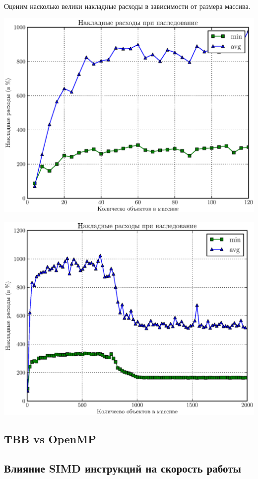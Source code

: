 \documentclass[12pt, a4paper]{article}
\begin{document}
Оценим насколько велики накладные расходы в зависимости от размера массива.

{\hspace*{-2.25cm}\includegraphics[scale=1]{apps/compare_virtual_methods_l.eps} }

{\hspace*{-2.25cm}\includegraphics[scale=1]{apps/compare_virtual_methods_b.eps} }

\subsection{TBB vs OpenMP}

\subsection{Влияние SIMD инструкций на скорость работы}
\end{document}
